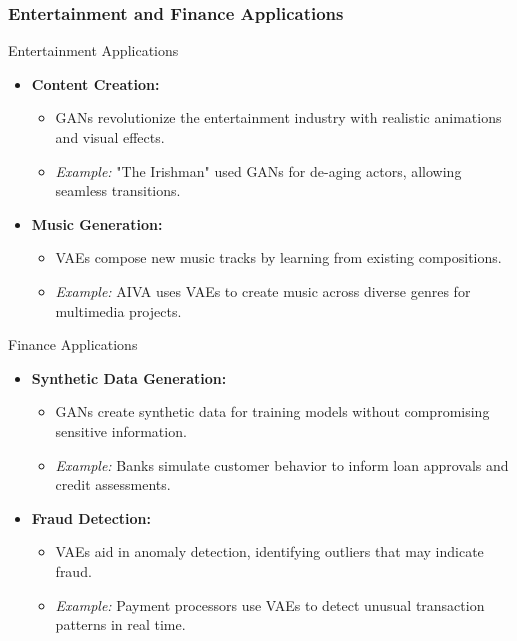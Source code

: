 \documentclass[aspectratio=169]{beamer}
\begin{document}
\begin{frame}[fragile]
    \frametitle{Entertainment and Finance Applications}
    \begin{block}{Entertainment Applications}
        \begin{itemize}
            \item \textbf{Content Creation:}
            \begin{itemize}
                \item GANs revolutionize the entertainment industry with realistic animations and visual effects.
                \item \textit{Example:} "The Irishman" used GANs for de-aging actors, allowing seamless transitions.
            \end{itemize}

            \item \textbf{Music Generation:}
            \begin{itemize}
                \item VAEs compose new music tracks by learning from existing compositions.
                \item \textit{Example:} AIVA uses VAEs to create music across diverse genres for multimedia projects.
            \end{itemize}
        \end{itemize}
    \end{block}
    
    \begin{block}{Finance Applications}
        \begin{itemize}
            \item \textbf{Synthetic Data Generation:}
            \begin{itemize}
                \item GANs create synthetic data for training models without compromising sensitive information.
                \item \textit{Example:} Banks simulate customer behavior to inform loan approvals and credit assessments.
            \end{itemize}

            \item \textbf{Fraud Detection:}
            \begin{itemize}
                \item VAEs aid in anomaly detection, identifying outliers that may indicate fraud.
                \item \textit{Example:} Payment processors use VAEs to detect unusual transaction patterns in real time.
            \end{itemize}
        \end{itemize}
    \end{block}
\end{frame}
\end{document}
